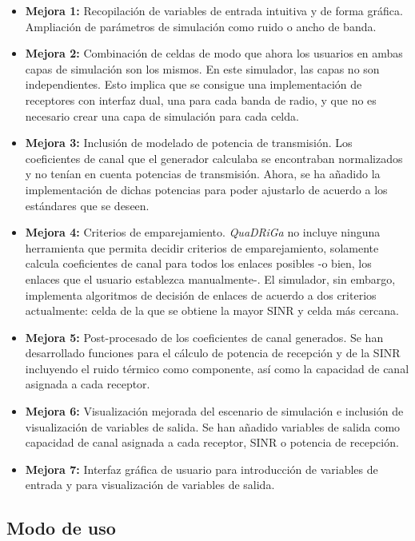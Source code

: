 \begin{itemize}
    \item \textbf{Mejora 1:} Recopilación de variables de entrada intuitiva y de forma gráfica. Ampliación de parámetros de simulación como ruido o ancho de banda.
    \item \textbf{Mejora 2:} Combinación de celdas de modo que ahora los usuarios en ambas capas de simulación son los mismos. En este simulador, las capas no son independientes. Esto implica que se consigue una implementación de receptores con interfaz dual, una para cada banda de radio, y que no es necesario crear una capa de simulación para cada celda.
    \item \textbf{Mejora 3:} Inclusión de modelado de potencia de transmisión. Los coeficientes de canal que el generador calculaba se encontraban normalizados y no tenían en cuenta potencias de transmisión. Ahora, se ha añadido la implementación de dichas potencias para poder ajustarlo de acuerdo a los estándares que se deseen.
    \item \textbf{Mejora 4:} Criterios de emparejamiento. \textit{QuaDRiGa} no incluye ninguna herramienta que permita decidir criterios de emparejamiento, solamente calcula coeficientes de canal para todos los enlaces posibles -o bien, los enlaces que el usuario establezca manualmente-. El simulador, sin embargo, implementa algoritmos de decisión de enlaces de acuerdo a dos criterios actualmente: celda de la que se obtiene la mayor SINR y celda más cercana.
    \item \textbf{Mejora 5:} Post-procesado de los coeficientes de canal generados. Se han desarrollado funciones para el cálculo de potencia de recepción y de la SINR incluyendo el ruido térmico como componente, así como la capacidad de canal asignada a cada receptor.
    \item  \textbf{Mejora 6:} Visualización mejorada del escenario de simulación e inclusión de visualización de variables de salida. Se han añadido variables de salida como capacidad de canal asignada a cada receptor, SINR o potencia de recepción.
    \item \textbf{Mejora 7:} Interfaz gráfica de usuario para introducción de variables de entrada y para visualización de variables de salida.
    
\end{itemize}

\subsection{Modo de uso}


